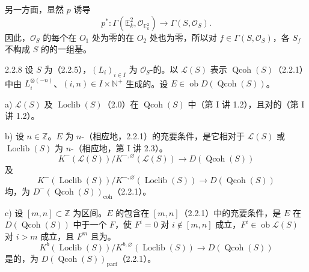 另一方面，显然 $p$ 诱导
\[
p^*:\Gamma(\mathbb E_k^2,\mathcal O_{\mathbb E_k^2})\longrightarrow\Gamma(S,\mathcal O_S).
\]
因此，$\mathcal O_S$ 的每个在 $O_1$ 处为零的在 $O_2$ 处也为零，所以对 $f\in\Gamma(S,\mathcal O_S)$，各 $S_f$ 不构成 $S$ 的的一组基。
\begin{SGAresult}{}{2.2.8}
设 $S$ 为（2.2.5），$(L_i)_{i\in I}$ 为 $\mathcal O_S$-的。以 $\mathcal L(S)$ 表示 $\operatorname{Qcoh}(S)$（2.2.1）中由 $L_i^{\otimes(-n)}$、$(i,n)\in I\times\mathbb N^+$ 生成的。设 $E\in\operatorname{ob}D(\operatorname{Qcoh}(S))$。

a) $\mathcal L(S)$ 及 $\operatorname{Loclib}(S)$（2.0）在 $\operatorname{Qcoh}(S)$ 中（第 I 讲 1.2），且对的（第 I 讲 1.2）。

b) 设 $n\in\mathbb Z$。$E$ 为 $n$-（相应地，2.2.1）的充要条件，是它相对于 $\mathcal L(S)$ 或 $\operatorname{Loclib}(S)$ 为 $n$-（相应地，第 I 讲 2.3）。
\[
K^-(\mathcal L(S))/K^{-,\varnothing}(\mathcal L(S))\longrightarrow D(\operatorname{Qcoh}(S))
\]
及
\[
K^-(\operatorname{Loclib}(S))/K^{-,\varnothing}(\operatorname{Loclib}(S))\longrightarrow D(\operatorname{Qcoh}(S))
\]
均，为 $D^-(\operatorname{Qcoh}(S))_{\mathrm{coh}}$（2.2.1）。

c) 设 $[m,n]\subset\mathbb Z$ 为区间。$E$ 的包含在 $[m,n]$（2.2.1）中的充要条件，是 $E$ 在 $D(\operatorname{Qcoh}(S))$ 中于一个 $F$，使 $F^i=0$ 对 $i\notin[m,n]$ 成立，$F^i\in\operatorname{ob}\mathcal L(S)$ 对 $i>m$ 成立，且 $F^m$ 且为。
\[
K^b(\operatorname{Loclib}(S))/K^{b,\varnothing}(\operatorname{Loclib}(S))\longrightarrow D(\operatorname{Qcoh}(S))
\]
是的，为 $D(\operatorname{Qcoh}(S))_{\mathrm{parf}}$（2.2.1）。
\end{SGAresult}
